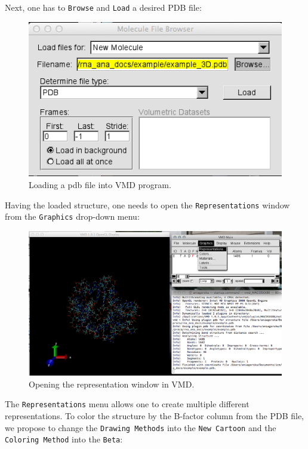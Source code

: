\documentclass[12pt]{article}
\begin{document}
Next, one has to \texttt{Browse} and \texttt{Load} a desired PDB file:
\begin{figure}[h!]
\centering
\includegraphics[scale=0.4]{./pictures/vmd2.png}
\caption{Loading a pdb file into VMD program.}
\end{figure}
\newpage
Having the loaded structure, one needs to open the \texttt{Representations} window from the \texttt{Graphics} drop-down menu:
\begin{figure}[h!]
\centering
\includegraphics[scale=0.4]{./pictures/vmd3.png}
\caption{Opening the representation window in VMD.}
\end{figure}

The \texttt{Representations} menu allows one to create multiple different representations. To color the structure by the B-factor column from the PDB file, we propose to change the \texttt{Drawing Methods} into the \texttt{New Cartoon} and the \texttt{Coloring Method} into the \texttt{Beta}:
\end{document}
